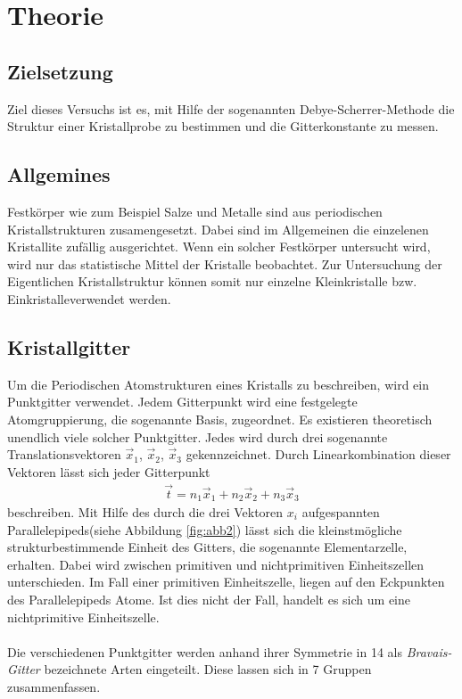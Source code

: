 \section{Theorie}
\label{sec:Theorie}

\subsection{Zielsetzung}
\label{subsec:Zielsetzung}
Ziel dieses Versuchs ist es, mit Hilfe der sogenannten
Debye-Scherrer-Methode die Struktur einer Kristallprobe
zu bestimmen und die Gitterkonstante zu messen.

\subsection{Allgemines}
\label{subsec:allgemein}

Festkörper wie zum Beispiel Salze und Metalle
sind aus periodischen
Kristallstrukturen zusamengesetzt. Dabei sind im
Allgemeinen die einzelenen Kristallite zufällig
ausgerichtet. Wenn ein solcher Festkörper untersucht wird,
wird nur das statistische Mittel der Kristalle beobachtet.
Zur Untersuchung der Eigentlichen Kristallstruktur
können somit nur einzelne Kleinkristalle bzw.
Einkristalleverwendet werden.


\subsection{Kristallgitter}
\label{subsec:kristallstrukturen}
Um die Periodischen Atomstrukturen eines Kristalls
zu beschreiben, wird ein Punktgitter verwendet.
Jedem Gitterpunkt wird eine festgelegte Atomgruppierung,
die sogenannte Basis, zugeordnet.
Es existieren theoretisch unendlich viele solcher Punktgitter.
Jedes wird durch drei sogenannte Translationsvektoren
$\vec{x}_{1}$, $\vec{x}_{2}$, $\vec{x}_{3}$ gekennzeichnet.
Durch Linearkombination dieser Vektoren lässt sich
jeder Gitterpunkt
\begin{align}
  \label{eqn:1*}
  \vec{t} = n_{1} \vec{x}_{1} + n_{2} \vec{x}_{2} + n_{3} \vec{x}_{3}
\end{align}
beschreiben.
Mit Hilfe des durch die drei Vektoren $x_{i}$ aufgespannten
Parallelepipeds(siehe Abbildung \ref{fig:abb2}) lässt sich die
kleinstmögliche strukturbestimmende Einheit des Gitters,
die sogenannte Elementarzelle, erhalten.
Dabei wird zwischen primitiven und nichtprimitiven Einheitszellen
unterschieden. Im Fall einer primitiven Einheitszelle,
liegen auf den Eckpunkten des Parallelepipeds Atome.
Ist dies nicht der Fall, handelt es sich um eine
nichtprimitive Einheitszelle.\\ \\
Die verschiedenen Punktgitter werden anhand ihrer Symmetrie
in 14 als \textit{Bravais-Gitter} bezeichnete Arten eingeteilt.
Diese lassen sich in 7 Gruppen zusammenfassen.
